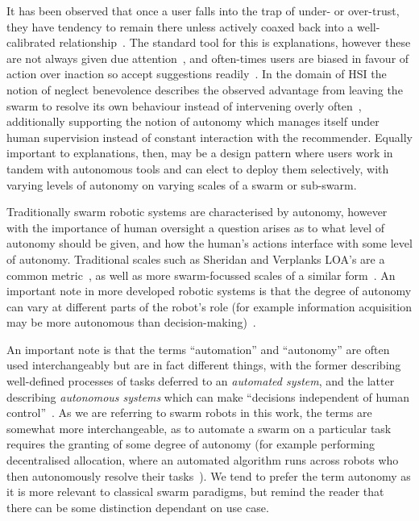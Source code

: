 \documentclass[10pt]{article}
\theoremstyle{definition}
\begin{document}
It has been observed that once a user falls into the trap of under- or over-trust, they have tendency to remain there unless actively coaxed back into a well-calibrated relationship~\cite{okamura_adaptive_2020}. The standard tool for this is explanations, however these are not always given due attention~\cite{naiseh_explainable_2021, wagner_explanation_2021}, and often-times users are biased in favour of action over inaction so accept suggestions readily~\cite{mosier_automation_1999}. In the domain of HSI the notion of neglect benevolence describes the observed advantage from leaving the swarm to resolve its own behaviour instead of intervening overly often~\cite{nagavalli2014neglect}, additionally supporting the notion of autonomy which manages itself under human supervision instead of constant interaction with the recommender. Equally important to explanations, then, may be a design pattern where users work in tandem with autonomous tools and can elect to deploy them selectively, with varying levels of autonomy on varying scales of a swarm or sub-swarm.

Traditionally swarm robotic systems are characterised by autonomy, however with the importance of human oversight a question arises as to what level of autonomy should be given, and how the human's actions interface with some level of autonomy. Traditional scales such as Sheridan and Verplanks LOA's are a common metric~\cite{sheridan1978human}, as well as more swarm-focussed scales of a similar form~\cite{hocraffer_meta-analysis_2017}. An important note in more developed robotic systems is that the degree of autonomy can vary at different parts of the robot's role (for example information acquisition may be more autonomous than decision-making)~\cite{onnasch_taxonomy_2021}.

An important note is that the terms ``automation'' and ``autonomy'' are often used interchangeably but are in fact different things, with the former describing well-defined processes of tasks deferred to an \textit{automated system}, and the latter describing \textit{autonomous systems} which can make ``decisions independent of human control''~\cite{lyons_humanautonomy_2021}. As we are referring to swarm robots in this work, the terms are somewhat more interchangeable, as to automate a swarm on a particular task requires the granting of some degree of autonomy (for example performing decentralised allocation, where an automated algorithm runs across robots who then autonomously resolve their tasks~\cite{Probably a maxsum ramchurn}). We tend to prefer the term autonomy as it is more relevant to classical swarm paradigms, but remind the reader that there can be some distinction dependant on use case.
\end{document}
